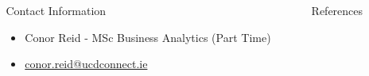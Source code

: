\documentclass[final]{beamer}
\newlength{\sepmargin}
\newlength{\sepwid}
\newlength{\onecolwid}
\begin{document}
\begin{frame}[t]
\begin{columns}[t]
\begin{column}{\sepmargin} \end{column}
\end{columns} 

	\begin{columns}[t] %
	\begin{column}{\sepmargin} \end{column}
	\begin{column}{\onecolwid} %
	\vspace*{-0.9cm}
	\begin{alertblock}{\large Contact Information}
	\vspace*{-0.5cm}
	\begin{footnotesize}
		\begin{itemize}
			\item {Conor Reid - MSc Business Analytics (Part Time)}
			\item \href{mailto:conor.reid@ucdconnect.ie}{conor.reid@ucdconnect.ie}
		\end{itemize}
	\end{footnotesize}	
	\end{alertblock}
	\end{column} %
	\begin{column}{\sepwid}\end{column} %
	\begin{column}{\onecolwid} %
	\begin{block}{\large References}
		\vspace*{-0.5cm}
              	\nocite{*} %
		{\footnotesize }
	\end{block} 
	\end{column} %
\begin{column}{\sepmargin}\end{column} %
\end{columns} %
\end{frame} %
\end{document}
